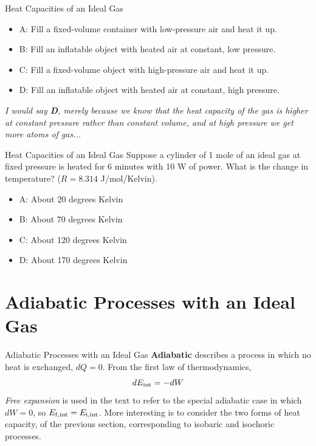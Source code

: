 \documentclass{beamer}
\begin{document}
\begin{frame}{Heat Capacities of an Ideal Gas}
\small
\begin{itemize}
\item A: Fill a fixed-volume container with low-pressure air and heat it up.
\item B: Fill an inflatable object with heated air at constant, low pressure.
\item C: Fill a fixed-volume object with high-pressure air and heat it up.
\item D: Fill an inflatable object with heated air at constant, high pressure.
\end{itemize}
\textit{I would say \textbf{D}, merely because we know that the heat capacity of the gas is higher at constant pressure rather than constant volume, and at high pressure we get more atoms of gas...}
\end{frame}

\begin{frame}{Heat Capacities of an Ideal Gas}
Suppose a cylinder of 1 mole of an ideal gas at fixed pressure is heated for 6 minutes with 10 W of power.  What is the change in temperature?  ($R = 8.314$ J/mol/Kelvin).
\begin{itemize}
\item A: About 20 degrees Kelvin
\item B: About 70 degrees Kelvin
\item C: About 120 degrees Kelvin
\item D: About 170 degrees Kelvin
\end{itemize}
\end{frame}

\section{Adiabatic Processes with an Ideal Gas}

\begin{frame}{Adiabatic Processes with an Ideal Gas}
\textbf{\alert{Adiabatic}} describes a process in which no heat is exchanged, $dQ = 0$.  From the first law of thermodynamics,
\begin{equation}
dE_{\rm int} = -dW
\end{equation}
\textit{Free expansion} is used in the text to refer to the special adiabatic case in which $dW = 0$, so $E_{\rm f,int} = E_{\rm i,int}$.  More interesting is to consider the two forms of heat capacity, of the previous section, corresponding to isobaric and isochoric processes.
\end{frame}
\end{document}
